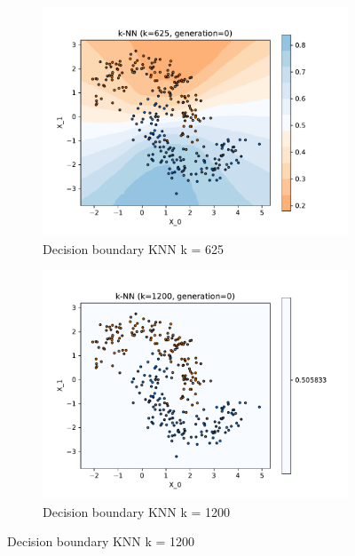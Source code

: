 \documentclass[acmconf,nonacm=true]{acmart}
\begin{document}
\begin{enumerate}
\begin{enumerate}
        \begin{figure}[H]
            \centering
                \begin{subfigure}[t]{.495\textwidth}
                    \includegraphics[width =1.2\textwidth]{knn_k_625_gen_0.pdf}
                    \caption{Decision boundary KNN k = 625}
                    \label{fig:knn_625}
                \end{subfigure}
                \hfill
                \begin{subfigure}[t]{.495\textwidth}
                    \includegraphics[width =1.2\textwidth]{knn_k_1200_gen_0.pdf}
                    \caption{Decision boundary KNN k = 1200}
                    \label{fig:knn_1200}
                \end{subfigure}
            \label{fig:knn_625_1200}
        \end{figure}


\end{enumerate}
\end{enumerate}
\end{document}

